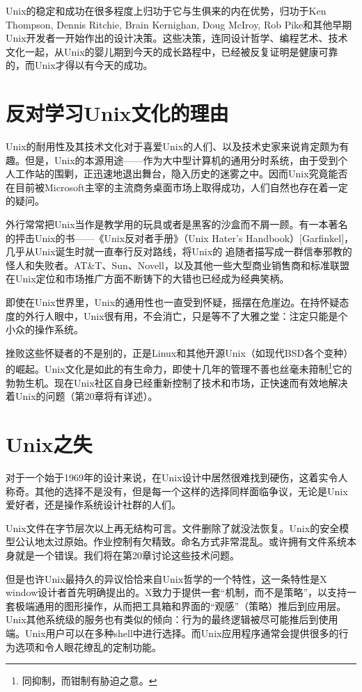 \documentclass[12pt,oneside]{book}
\begin{document}
\begin{common-format}
Unix的稳定和成功在很多程度上归功于它与生俱来的内在优势，归功于Ken Thompson, Dennis Ritchie, Brain Kernighan, Doug McIroy, Rob Pike和其他早期Unix开发者一开始作出的设计决策。这些决策，连同设计哲学、编程艺术、技术文化一起，从Unix的婴儿期到今天的成长路程中，已经被反复证明是健康可靠的，而Unix才得以有今天的成功。


\section{反对学习Unix文化的理由}
Unix的耐用性及其技术文化对于喜爱Unix的人们、以及技术史家来说肯定颇为有趣。但是，Unix的本源用途——作为大中型计算机的通用分时系统，由于受到个人工作站的围剿，正迅速地退出舞台，隐入历史的迷雾之中。因而Unix究竟能否在目前被Microsoft主宰的主流商务桌面市场上取得成功，人们自然也存在着一定的疑问。

外行常常把Unix当作是教学用的玩具或者是黑客的沙盒而不屑一顾。有一本著名的抨击Unix的书——《Unix反对者手册》（Unix Hater's Handbook）[Garfinkel]，几乎从Unix诞生时就一直奉行反对路线，将Unix的 追随者描写成一群信奉邪教的怪人和失败者。AT\&{}T、Sun、Novell，以及其他一些大型商业销售商和标准联盟在Unix定位和市场推广方面不断铸下的大错也已经成为经典笑柄。

即使在Unix世界里，Unix的通用性也一直受到怀疑，摇摆在危崖边。在持怀疑态度的外行人眼中，Unix很有用，不会消亡，只是等不了大雅之堂：注定只能是个小众的操作系统。

挫败这些怀疑者的不是别的，正是Linux和其他开源Unix（如现代BSD各个变种）的崛起。Unix文化是如此的有生命力，即使十几年的管理不善也丝毫未箝制\footnote{同抑制，而钳制有胁迫之意。}它的勃勃生机。现在Unix社区自身已经重新控制了技术和市场，正快速而有效地解决着Unix的问题（第20章将有详述）。


\section{Unix之失}
对于一个始于1969年的设计来说，在Unix设计中居然很难找到硬伤，这着实令人称奇。其他的选择不是没有，但是每一个这样的选择同样面临争议，无论是Unix爱好者，还是操作系统设计社群的人们。

Unix文件在字节层次以上再无结构可言。文件删除了就没法恢复。Unix的安全模型公认地太过原始。作业控制有欠精致。命名方式非常混乱。或许拥有文件系统本身就是一个错误。我们将在第20章讨论这些技术问题。

但是也许Unix最持久的异议恰恰来自Unix哲学的一个特性，这一条特性是X window设计者首先明确提出的。X致力于提供一套“机制，而不是策略”，以支持一套极端通用的图形操作，从而把工具箱和界面的“观感”（策略）推后到应用层。Unix其他系统级的服务也有类似的倾向：行为的最终逻辑被尽可能推后到使用端。Unix用户可以在多种shell中进行选择。而Unix应用程序通常会提供很多的行为选项和令人眼花缭乱的定制功能。


\end{common-format}
\end{document}
